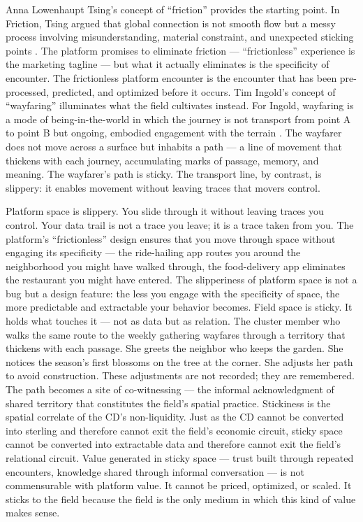Anna Lowenhaupt Tsing’s concept of “friction” provides the starting point. In Friction, Tsing argued that global connection is not smooth flow but a messy process involving misunderstanding, material constraint, and unexpected sticking points \cite[pp.~1--6]{tsing_2005}. The platform promises to eliminate friction — “frictionless” experience is the marketing tagline — but what it actually eliminates is the specificity of encounter. The frictionless platform encounter is the encounter that has been pre-processed, predicted, and optimized before it occurs. Tim Ingold’s concept of “wayfaring” illuminates what the field cultivates instead. For Ingold, wayfaring is a mode of being-in-the-world in which the journey is not transport from point A to point B but ongoing, embodied engagement with the terrain \cite[pp.~12--35]{ingold_2011}. The wayfarer does not move across a surface but inhabits a path — a line of movement that thickens with each journey, accumulating marks of passage, memory, and meaning. The wayfarer’s path is sticky. The transport line, by contrast, is slippery: it enables movement without leaving traces that movers control.

Platform space is slippery. You slide through it without leaving traces you control. Your data trail is not a trace you leave; it is a trace taken from you. The platform’s “frictionless” design ensures that you move through space without engaging its specificity — the ride-hailing app routes you around the neighborhood you might have walked through, the food-delivery app eliminates the restaurant you might have entered. The slipperiness of platform space is not a bug but a design feature: the less you engage with the specificity of space, the more predictable and extractable your behavior becomes. Field space is sticky. It holds what touches it — not as data but as relation. The cluster member who walks the same route to the weekly gathering wayfares through a territory that thickens with each passage. She greets the neighbor who keeps the garden. She notices the season’s first blossoms on the tree at the corner. She adjusts her path to avoid construction. These adjustments are not recorded; they are remembered. The path becomes a site of co-witnessing — the informal acknowledgment of shared territory that constitutes the field’s spatial practice. Stickiness is the spatial correlate of the CD’s non-liquidity. Just as the CD cannot be converted into sterling and therefore cannot exit the field’s economic circuit, sticky space cannot be converted into extractable data and therefore cannot exit the field’s relational circuit. Value generated in sticky space — trust built through repeated encounters, knowledge shared through informal conversation — is not commensurable with platform value. It cannot be priced, optimized, or scaled. It sticks to the field because the field is the only medium in which this kind of value makes sense.

